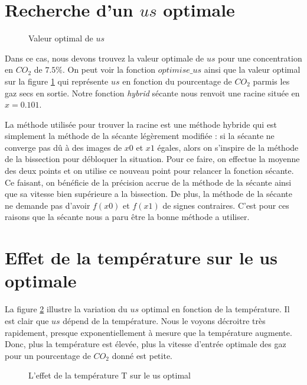 \documentclass[11pt]{report}
\begin{document}
        \section{Recherche d'un $us$ optimale}
            \begin{figure}[h]
                \centering
                
                \caption{Valeur optimal de $us$}
                \label{graph:us}
            \end{figure}
            Dans ce cas, nous devons trouvez la valeur optimale de $us$ pour une concentration
            en $CO_2$ de $7.5\%$.
            On peut voir la fonction $optimise\_us$ ainsi que la valeur optimal sur la figure \ref{graph:us}
            qui représente $us$ en fonction du pourcentage de $CO_2$ parmis les gaz secs en sortie.
            Notre fonction \textit{hybrid} sécante nous renvoit une racine située en $x = 0.101$.
            \par
            La méthode utilisée pour trouver la racine est une méthode hybride qui est simplement
            la méthode de la sécante légèrement modifiée : si la sécante ne converge pas dû à des
            images de $x0$ et $x1$ égales,
            alors on s'inspire de la méthode de la bissection pour  débloquer la situation.
            Pour ce faire, on effectue la moyenne des deux points et on utilise ce nouveau point pour relancer
            la fonction sécante. Ce faisant, on bénéficie de la précision accrue de la méthode de la sécante
            ainsi que sa vitesse bien supérieure a la bissection. De plus, la méthode de la sécante ne demande 
            pas d'avoir $f(x0)$ et $f(x1)$ de signes contraires. C'est pour ces raisons que la sécante nous a 
            paru être la bonne méthode a utiliser.
        \section{Effet de la température sur le us optimale}
            La figure \ref{graph:us/T} illustre la variation du $us$ optimal en fonction de la température.
            Il est clair que $us$ dépend de la température. 
            Nous le voyons décroitre très rapidement, presque exponentiellement à mesure que la température augmente.
            Donc, plus la température est élevée, plus la vitesse d'entrée
            optimale des gaz pour un pourcentage de $CO_2$ donné est petite.
            \begin{figure}[h]
                \centering
                
                \caption{L'effet de la température T sur le us optimal}
                \label{graph:us/T}
            \end{figure}
\end{document}
